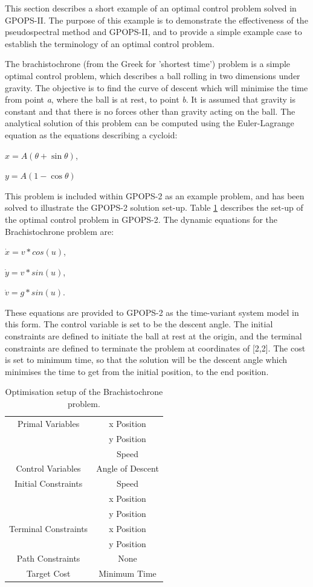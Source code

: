 This section describes a short example of an optimal control problem solved in GPOPS-II. The purpose of this example is to demonstrate the effectiveness of the pseudospectral method and GPOPS-II, and to provide a simple example case to establish the terminology of an optimal control problem.  


The brachistochrone (from the Greek for 'shortest time') problem is a simple optimal control problem, which describes a ball rolling in two dimensions under gravity. The objective is to find the curve of descent which will minimise the time from point \textit{a}, where the ball is at rest, to point \textit{b}. It is assumed that gravity is constant and that there is no forces other than gravity acting on the ball. 
The analytical solution of this problem can be computed using the Euler-Lagrange equation as the equations describing a cycloid:

$x = A(\theta + \sin\theta) $,

$y=A(1 - \cos\theta)$

This problem is included within GPOPS-2 as an example problem, and has been solved to illustrate the GPOPS-2 solution set-up\cite{Rao2010}. Table \ref{tab:brachistochrone} describes the set-up of the optimal control problem in GPOPS-2. The dynamic equations for the Brachistochrone problem are:

$\dot{x} = v*cos(u)$,

$\dot{y} = v*sin(u)$,

$\dot{v} = g*sin(u)$.

\noindent These equations are provided to GPOPS-2 as the time-variant system model in this form. The control variable is set to be the descent angle. The initial constraints are defined to initiate the ball at rest at the origin, and the terminal constraints are defined to terminate the problem at coordinates of [2,2]. The cost is set to minimum time, so that the solution will be the descent angle which minimises the time to get from the initial position, to the end position. 

\begin{table}
	\centering
	\begin{tabular}{|c|c|}
		\hline Primal Variables  & x Position\\& y Position\\& Speed\\ 
		\hline Control Variables  & Angle of Descent\\ 
		\hline Initial Constraints  & Speed\\ & x Position\\ & y Position\\
		\hline Terminal Constraints &  x Position\\ & y Position\\
		\hline Path Constraints & None \\ 
		\hline Target Cost & Minimum Time \\ 
		\hline 
	\end{tabular} 
	\caption{Optimisation setup of the Brachistochrone problem. }
	\label{tab:brachistochrone}
\end{table}


